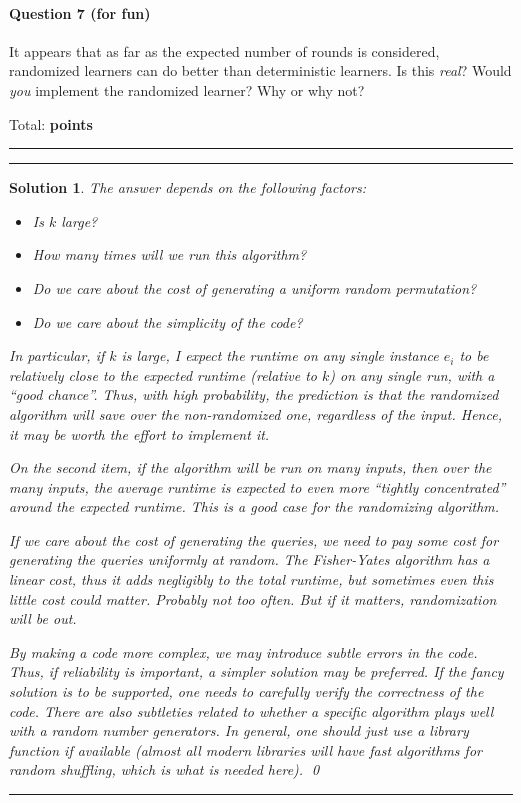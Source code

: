 \documentclass{article}
\DeclareMathOperator*{\1}{\mathbbm{1}}
\newcounter{DocPoints} %
\newcounter{QuestionPoints} %
\newcommand{\tpoints}[1]{        %
	\ifthenelse{\isempty{#1}}%
	{%
	}%
	{%
		\addtocounter{DocPoints}{#1}
		\addtocounter{QuestionPoints}{#1}
	}													 %
	\par\mbox{}\par\noindent\hfill {Total: \bf \arabic{QuestionPoints}\xspace points}\par\mbox{}\par\hrule\hrule
	\setcounter{QuestionPoints}{0}
}
\newtheorem*{solution*}{Solution}
\begin{document}
\paragraph{Question 7 (for fun)} 
It appears that as far as the expected number of rounds is considered,
randomized learners can do better than deterministic learners.
Is this \emph{real}?
Would \emph{you} implement the randomized learner? Why or why not?
\medskip

\tpoints{0}

\begin{solution*}
The answer depends on the following factors:
\begin{itemize}
\item Is $k$ large?
\item How many times will we run this algorithm?
\item Do we care about the cost of generating a uniform random permutation?
\item Do we care about the simplicity of the code?
\end{itemize}
In particular, if $k$ is large, I expect the runtime on any single instance $e_i$ to be relatively close to the expected runtime (relative to $k$) on any single run, with a ``good chance''. Thus, with high probability, the prediction is that the randomized algorithm will save over the non-randomized one, regardless of the input. Hence, it may be worth the effort to implement it.

On the second item, if the algorithm will be run on many inputs, then over the many inputs, the average runtime is expected to even more ``tightly concentrated'' around the expected runtime. This is a good case for the randomizing algorithm.

If we care about the cost of generating the queries, we need to pay some cost for generating the queries uniformly at random. The Fisher-Yates algorithm has a linear cost, thus it adds negligibly to the total runtime, but sometimes even this little cost could matter. Probably not too often. But if it matters, randomization will be out.

By making a code more complex, we may introduce subtle errors in the code. Thus, if reliability is important, a simpler solution may be preferred. If the fancy solution is to be supported, one needs to carefully verify the correctness of the code. There are also subtleties related to whether a specific algorithm plays well with a random number generators. In general, one should just use a library function if available (almost all modern libraries will have fast algorithms for random shuffling, which is what is needed here). 
\qed\par\bigskip\par\hrule
\end{solution*}
\end{document}
